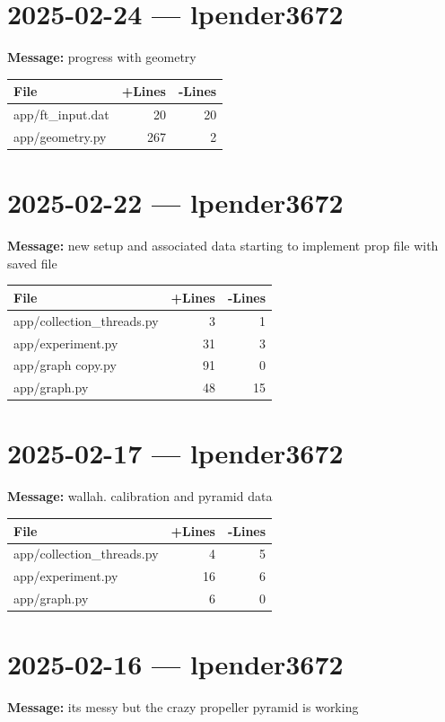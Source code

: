 \documentclass{article}
\begin{document}
\section*{2025-02-24 --- lpender3672}
\textbf{Message:} progress with geometry

\begin{longtable}{|p{10cm}|r|r|}
\hline \textbf{File} & \textbf{+Lines} & \textbf{-Lines} \\
\hline
app/ft\_input.dat & 20 & 20 \\
\hline
app/geometry.py & 267 & 2 \\
\hline
\end{longtable}

\section*{2025-02-22 --- lpender3672}
\textbf{Message:} new setup and associated data starting to implement prop file with saved file

\begin{longtable}{|p{10cm}|r|r|}
\hline \textbf{File} & \textbf{+Lines} & \textbf{-Lines} \\
\hline
app/collection\_threads.py & 3 & 1 \\
\hline
app/experiment.py & 31 & 3 \\
\hline
app/graph copy.py & 91 & 0 \\
\hline
app/graph.py & 48 & 15 \\
\hline
\end{longtable}

\section*{2025-02-17 --- lpender3672}
\textbf{Message:} wallah. calibration and pyramid data

\begin{longtable}{|p{10cm}|r|r|}
\hline \textbf{File} & \textbf{+Lines} & \textbf{-Lines} \\
\hline
app/collection\_threads.py & 4 & 5 \\
\hline
app/experiment.py & 16 & 6 \\
\hline
app/graph.py & 6 & 0 \\
\hline
\end{longtable}

\section*{2025-02-16 --- lpender3672}
\textbf{Message:} its messy but the crazy propeller pyramid is working
\end{document}
